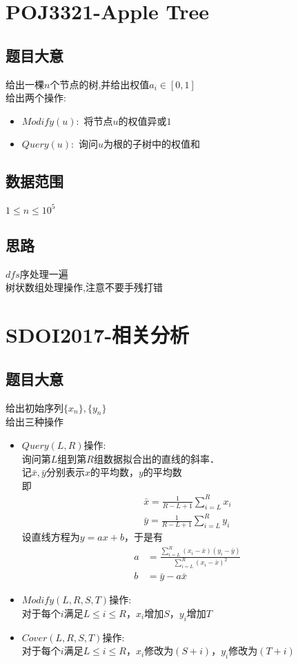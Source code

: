 \documentclass{ctexart}
\numberwithin{equation}{section}
\begin{document}
\begin{flushleft}
  \newpage
  \section{POJ3321-Apple Tree}
  \subsection{题目大意}
  给出一棵$n$个节点的树,并给出权值$a_i \in [0,1]$ \\
  给出两个操作: \\
  \begin{itemize}
  \item $Modify(u):$ 将节点$u$的权值异或$1$
  \item $Query(u):$ 询问$u$为根的子树中的权值和
  \end{itemize}
  \subsection{数据范围}
  $1\le n\le 10^5$ \\
  \subsection{思路}
  $dfs$序处理一遍 \\
  树状数组处理操作,注意不要手残打错\\
  \newpage
  
  \section{SDOI2017-相关分析}
  \subsection{题目大意}
  给出初始序列$\{x_n\},\{y_n\}$\\
  给出三种操作
  \begin{itemize}
  \item $Query(L,R)$操作:\\
    询问第$L$组到第$R$组数据拟合出的直线的斜率．\\
    记$\bar{x},\bar{y}$分别表示$x$的平均数，$y$的平均数\\
    即
    \begin{gather*}
      \bar{x} = \frac{1}{R-L+1}\sum_{i=L}^{R}x_i\\
      \bar{y} = \frac{1}{R-L+1}\sum_{i=L}^{R}y_i
    \end{gather*}
    设直线方程为$y=ax+b$，于是有
    \begin{align}
      a &= \frac{\sum\limits_{i=L}^{R}(x_i-\bar{x})(y_i- \bar{y})}{\sum\limits_{i=L}^{R}(x_i-\bar{x})^2} \\
      b &= \bar{y}-a\bar{x}
    \end{align}
  \item $Modify(L,R,S,T)$操作:\\
    对于每个$i$满足$L\leq i\leq R$，$x_i$增加$S$，$y_i$增加$T$\\
  \item $Cover(L,R,S,T)$操作:　\\
    对于每个$i$满足$L\leq i\leq R$，$x_i$修改为$(S+i)$，$y_i$修改为$(T+i)$\\ 
  \end{itemize}

\end{flushleft}
\end{document}
